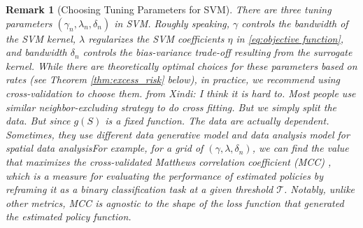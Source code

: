 \documentclass[12pt]{article}
\newtheorem{remark}{Remark}
\newcommand{\CP}[1]{{\color{purple}From Chan: #1}}
\newcommand{\XL}[1]{{\color{blue}from Xindi: #1}}
\begin{document}
 \begin{remark}[Choosing Tuning Parameters for SVM] There are three tuning parameters $(\gamma_n, \lambda_n, \delta_n)$ in SVM. Roughly speaking,  $\gamma$ controls the bandwidth of the SVM kernel, $\lambda$ regularizes the SVM coefficients $\eta$ in \eqref{eq:objective function}, and bandwidth ${\delta_n}$ controls the bias-variance trade-off resulting from the surrogate kernel. While there are theoretically optimal choices for these parameters based on rates  (see Theorem \ref{thm:excess_risk} below), in practice, we recommend using cross-validation to choose them. \XL{I think it is hard to. Most people use similar neighbor-excluding strategy to do cross fitting. But we simply split the data. But since $g(S)$ is a fixed function. The data are actually dependent. Sometimes, they use different data generative model and data analysis model for spatial data analysis}For example, %
 for a grid of 
 $(\gamma,\lambda,\delta_n)$, we can find the value that maximizes the cross-validated Matthews correlation coefficient (MCC) \citep{MCC}, 
which is a measure for evaluating the performance of estimated policies by reframing it as a binary classification task at a given threshold $\mathcal{T}$. Notably, unlike other metrics, MCC is agnostic to the shape of the loss function that generated the estimated policy function.
    
 \end{remark}
\end{document}
